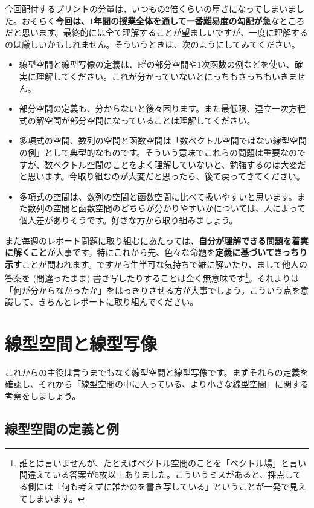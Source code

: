 今回配付するプリントの分量は、いつもの$2$倍くらいの厚さになってしまいました。おそらく\textbf{今回は、$1$年間の授業全体を通して一番難易度の勾配が急}なところだと思います。最終的には全て理解することが望ましいですが、一度に理解するのは厳しいかもしれません。そういうときは、次のようにしてみてください。
\begin{itemize}
\item 線型空間と線型写像の定義は、$\mathbb{R}^2$の部分空間や$1$次函数の例などを使い、確実に理解してください。これが分かっていないとにっちもさっちもいきません。
\item 部分空間の定義も、分からないと後々困ります。また最低限、連立一次方程式の解空間が部分空間になっていることは理解してください。
\item 多項式の空間、数列の空間と函数空間は「数ベクトル空間ではない線型空間の例」として典型的なものです。そういう意味でこれらの問題は重要なのですが、数ベクトル空間のことをよく理解していないと、勉強するのは大変だと思います。今取り組むのが大変だと思ったら、後で戻ってきてください。
\item 多項式の空間は、数列の空間と函数空間に比べて扱いやすいと思います。また数列の空間と函数空間のどちらが分かりやすいかについては、人によって個人差がありそうです。好きな方から取り組みましょう。
\end{itemize}

また毎週のレポート問題に取り組むにあたっては、\textbf{自分が理解できる問題を着実に解くこと}が大事です。特にこれから先、色々な命題を\textbf{定義に基づいてきっちり示す}ことが問われます。ですから生半可な気持ちで雑に解いたり、まして他人の答案を (間違ったまま) 書き写したりすることは全く無意味です\footnote{誰とは言いませんが、たとえばベクトル空間のことを「ベクトル場」と言い間違えている答案が$5$枚以上ありました。こういうミスがあると、採点してる側には「何も考えずに誰かのを書き写している」ということが一発で見えてしまいます。}。それよりは「何が分からなかったか」をはっきりさせる方が大事でしょう。こういう点を意識して、きちんとレポートに取り組んでください。

\section{線型空間と線型写像}

これからの主役は言うまでもなく線型空間と線型写像です。まずそれらの定義を確認し、それから「線型空間の中に入っている、より小さな線型空間」に関する考察をしましょう。

\subsection{線型空間の定義と例}

